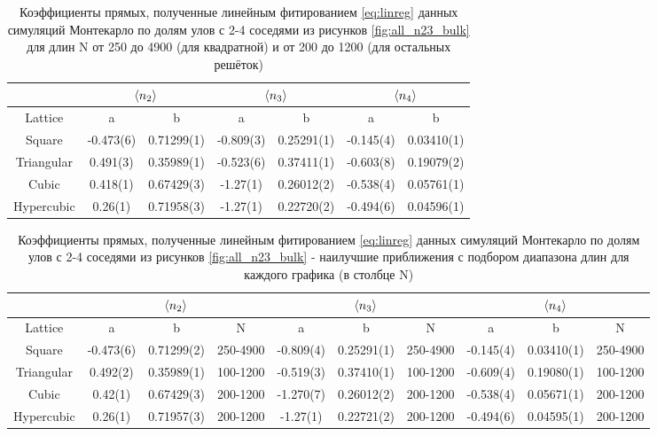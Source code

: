 \begin{table}[h]
    \centering
    \begin{tabular}{|c|c|c|c|c|c|c|} \hline
         & \multicolumn{2}{|c|}{$\langle n_{2} \rangle$} & \multicolumn{2}{|c|}{$\langle n_{3} \rangle$} & \multicolumn{2}{|c|}{$\langle n_{4} \rangle$}\\ \hline
         Lattice & a & b & a & b  & a & b  \\ \hline
        Square & -0.473(6) & 0.71299(1) & -0.809(3) & 0.25291(1) &  -0.145(4) & 0.03410(1)  \\ \hline
        Triangular & 0.491(3) & 0.35989(1) & -0.523(6) & 0.37411(1) & -0.603(8) & 0.19079(2)  \\ \hline
        Cubic & 0.418(1) & 0.67429(3) &  -1.27(1) & 0.26012(2) & -0.538(4) & 0.05761(1) \\ \hline
        Hypercubic & 0.26(1) & 0.71958(3) & -1.27(1) & 0.22720(2) & -0.494(6) & 0.04596(1)\\ \hline
    \end{tabular}
    \caption{Коэффициенты прямых, полученные линейным фитированием \eqref{eq:linreg} данных симуляций Монтекарло по долям улов с 2-4 соседями из рисунков \ref{fig:all_n23_bulk} для длин N от 250 до 4900 (для квадратной) и от 200 до 1200 (для остальных решёток)}
    \label{tab:n24_fit_coeff_200}
\end{table}

\begin{table}[h]
    \centering
    \begin{tabular}{|c|c|c|c|c|c|c|c|c|c|} \hline
         & \multicolumn{3}{|c|}{$\langle n_{2} \rangle$} & \multicolumn{3}{|c|}{$\langle n_{3} \rangle$} & \multicolumn{3}{|c|}{$\langle n_{4} \rangle$}\\ \hline
         Lattice & a & b & N & a & b & N & a & b & N \\ \hline
        Square & -0.473(6) & 0.71299(2) & 250-4900 & -0.809(4) & 0.25291(1) & 250-4900 & -0.145(4) & 0.03410(1) & 250-4900  \\ \hline
        Triangular & 0.492(2) & 0.35989(1) & 100-1200 & -0.519(3) & 0.37410(1) & 100-1200 & -0.609(4) & 0.19080(1) & 100-1200 \\ \hline
        Cubic & 0.42(1) & 0.67429(3) & 200-1200 & -1.270(7) & 0.26012(2) & 200-1200 & -0.538(4) & 0.05671(1) & 200-1200 \\ \hline
        Hypercubic & 0.26(1) & 0.71957(3) & 200-1200 & -1.27(1) & 0.22721(2) & 200-1200 & -0.494(6) & 0.04595(1) & 200-1200\\ \hline
    \end{tabular}
    \caption{Коэффициенты прямых, полученные линейным фитированием \eqref{eq:linreg} данных симуляций Монтекарло по долям улов с 2-4 соседями из рисунков \ref{fig:all_n23_bulk} - наилучшие приближения с подбором диапазона длин для каждого графика (в столбце N)}
    \label{tab:n24_fit_coeff}
\end{table}

